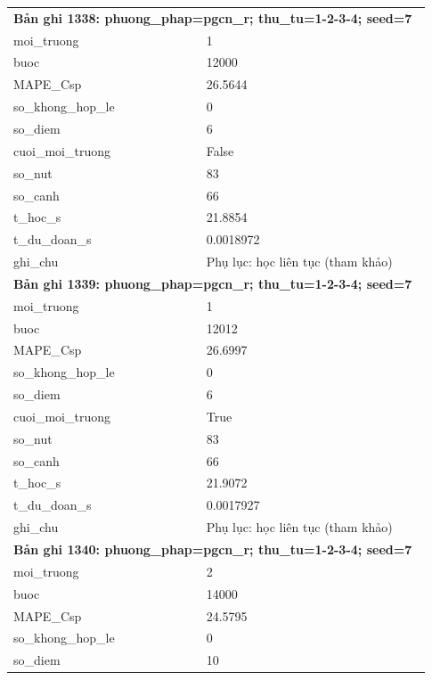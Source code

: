 \begin{longtable}{p{0.43\linewidth}p{0.50\linewidth}}
\midrule
\multicolumn{2}{p{0.95\linewidth}}{\textbf{Bản ghi 1338: phuong\_phap=pgcn\_r; thu\_tu=1-2-3-4; seed=7}} \\
moi\_\allowbreak truong & 1 \\
buoc & 12000 \\
MAPE\_\allowbreak Csp & 26.5644 \\
so\_\allowbreak khong\_\allowbreak hop\_\allowbreak le & 0 \\
so\_\allowbreak diem & 6 \\
cuoi\_\allowbreak moi\_\allowbreak truong & False \\
so\_\allowbreak nut & 83 \\
so\_\allowbreak canh & 66 \\
t\_\allowbreak hoc\_\allowbreak s & 21.8854 \\
t\_\allowbreak du\_\allowbreak doan\_\allowbreak s & 0.0018972 \\
ghi\_\allowbreak chu & Phụ lục: học liên tục (tham khảo) \\
\midrule
\multicolumn{2}{p{0.95\linewidth}}{\textbf{Bản ghi 1339: phuong\_phap=pgcn\_r; thu\_tu=1-2-3-4; seed=7}} \\
moi\_\allowbreak truong & 1 \\
buoc & 12012 \\
MAPE\_\allowbreak Csp & 26.6997 \\
so\_\allowbreak khong\_\allowbreak hop\_\allowbreak le & 0 \\
so\_\allowbreak diem & 6 \\
cuoi\_\allowbreak moi\_\allowbreak truong & True \\
so\_\allowbreak nut & 83 \\
so\_\allowbreak canh & 66 \\
t\_\allowbreak hoc\_\allowbreak s & 21.9072 \\
t\_\allowbreak du\_\allowbreak doan\_\allowbreak s & 0.0017927 \\
ghi\_\allowbreak chu & Phụ lục: học liên tục (tham khảo) \\
\midrule
\multicolumn{2}{p{0.95\linewidth}}{\textbf{Bản ghi 1340: phuong\_phap=pgcn\_r; thu\_tu=1-2-3-4; seed=7}} \\
moi\_\allowbreak truong & 2 \\
buoc & 14000 \\
MAPE\_\allowbreak Csp & 24.5795 \\
so\_\allowbreak khong\_\allowbreak hop\_\allowbreak le & 0 \\
so\_\allowbreak diem & 10 \\

\end{longtable}
